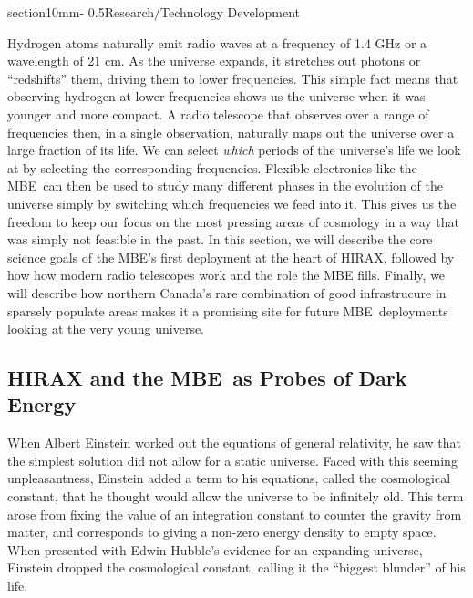 \documentclass[letterpaper,11pt,preprint]{aastex}
\makeatletter
\newcommand{\mbe}{{\rm MBE}}
\renewcommand{\section}{\@startsection%
{section}{1}{0mm}{-\baselineskip}%
{0.5\baselineskip}{\normalfont\Large\bfseries}}%
\makeatother
\begin{document}
\section{Research/Technology Development}

Hydrogen atoms naturally emit radio waves at a frequency of 1.4 GHz or
a wavelength of 21 cm.  As the universe expands, it stretches out
photons or ``redshifts'' them, driving them to lower frequencies.
This simple fact means that observing hydrogen at lower frequencies
shows us the universe when it was younger and more compact.  A radio
telescope that observes over a range of frequencies then, in a single
observation, naturally maps out the universe over a large fraction of
its life.  We can select {\it{which}} periods of the universe's life
we look at by selecting the corresponding frequencies.  Flexible
electronics like the \mbe\ can then be used to study many different
phases in the evolution of the universe simply by switching which
frequencies we feed into it.  This gives us the freedom to keep our
focus on the most pressing areas of cosmology in a way that was simply
not feasible in the past.  In this section, we will describe the core
science goals of the \mbe's first deployment at the heart of HIRAX,
followed by how how modern radio telescopes work and the role the \mbe
fills.  Finally, we will describe how northern Canada's rare
combination of good infrastrucure in sparsely populate areas makes it
a promising site for future \mbe\ deployments looking at the very young
universe.


\subsection{HIRAX and the \mbe\ as  Probes of Dark Energy}

When Albert Einstein worked out the equations of general relativity,
he saw that the simplest solution did not allow for a static
universe. Faced with this seeming unpleasantness, Einstein added a
term to his equations, called the cosmological constant, that he
thought would allow the universe to be infinitely old.  This term
arose from fixing the value of an integration constant to counter the
gravity from matter, and corresponds to giving a non-zero energy
density to empty space.  When presented with Edwin Hubble's evidence
for an expanding universe, Einstein dropped the cosmological constant,
calling it the ``biggest blunder'' of his life.  
\end{document}
